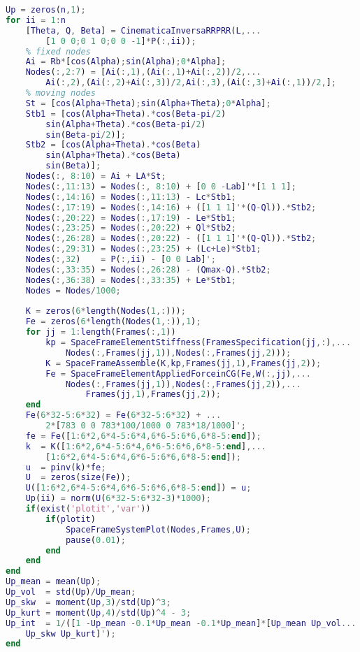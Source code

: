 \begin{lstlisting}[frame=single,language = matlab]
Up = zeros(n,1);
for ii = 1:n
    [Theta, Q, Beta] = CinematicaInversaRRPRR(L,...
        [1 0 0;0 1 0;0 0 -1]*P(:,ii));
    % fixed nodes
    Ai = Rb*[cos(Alpha);sin(Alpha);0*Alpha];
    Nodes(:,2:7) = [Ai(:,1),(Ai(:,1)+Ai(:,2))/2,...
        Ai(:,2),(Ai(:,2)+Ai(:,3))/2,Ai(:,3),(Ai(:,3)+Ai(:,1))/2,];
    % moving nodes
    St = [cos(Alpha+Theta);sin(Alpha+Theta);0*Alpha];
    Stb1 = [cos(Alpha+Theta).*cos(Beta-pi/2)
        sin(Alpha+Theta).*cos(Beta-pi/2)
        sin(Beta-pi/2)];
    Stb2 = [cos(Alpha+Theta).*cos(Beta)
        sin(Alpha+Theta).*cos(Beta)
        sin(Beta)];
    Nodes(:, 8:10) = Ai + LA*St;
    Nodes(:,11:13) = Nodes(:, 8:10) + [0 0 -Lab]'*[1 1 1];
    Nodes(:,14:16) = Nodes(:,11:13) - Lc*Stb1;
    Nodes(:,17:19) = Nodes(:,14:16) + ([1 1 1]'*(Q-Ql)).*Stb2;
    Nodes(:,20:22) = Nodes(:,17:19) - Le*Stb1;
    Nodes(:,23:25) = Nodes(:,20:22) + Ql*Stb2;
    Nodes(:,26:28) = Nodes(:,20:22) - ([1 1 1]'*(Q-Ql)).*Stb2;
    Nodes(:,29:31) = Nodes(:,23:25) + (Lc+Le)*Stb1;
    Nodes(:,32)    = P(:,ii) - [0 0 Lab]';
    Nodes(:,33:35) = Nodes(:,26:28) - (Qmax-Q).*Stb2;
    Nodes(:,36:38) = Nodes(:,33:35) + Le*Stb1;
    Nodes = Nodes/1000;
    
    K = zeros(6*length(Nodes(1,:)));
    Fe = zeros(6*length(Nodes(1,:)),1);
    for jj = 1:length(Frames(:,1))
        kp = SpaceFrameElementStiffness(FramesSpecification(jj,:),...
            Nodes(:,Frames(jj,1)),Nodes(:,Frames(jj,2)));
        K = SpaceFrameAssemble(K,kp,Frames(jj,1),Frames(jj,2));
        Fe = SpaceFrameElementAppliedForceinCG(Fe,W(:,jj),...
            Nodes(:,Frames(jj,1)),Nodes(:,Frames(jj,2)),...
                Frames(jj,1),Frames(jj,2));
    end
    Fe(6*32-5:6*32) = Fe(6*32-5:6*32) + ...
        2*[783 0 0 783*100/1000 0 783*18/1000]';
    fe = Fe([1:6*2,6*4-5:6*4,6*6-5:6*6,6*8-5:end]);
    k  = K([1:6*2,6*4-5:6*4,6*6-5:6*6,6*8-5:end],...
        [1:6*2,6*4-5:6*4,6*6-5:6*6,6*8-5:end]);
    u  = pinv(k)*fe;
    U  = zeros(size(Fe));
    U([1:6*2,6*4-5:6*4,6*6-5:6*6,6*8-5:end]) = u;
    Up(ii) = norm(U(6*32-5:6*32-3)*1000);
    if(exist('plotit','var'))
        if(plotit)
            SpaceFrameSystemPlot(Nodes,Frames,U);
            pause(0.01);
        end
    end
end
Up_mean = mean(Up);
Up_vol  = std(Up)/Up_mean;
Up_skw  = moment(Up,3)/std(Up)^3;
Up_kurt = moment(Up,4)/std(Up)^4 - 3;
Up_int  = 1/([1 -Up_mean -0.1*Up_mean -0.1*Up_mean]*[Up_mean Up_vol...
    Up_skw Up_kurt]'); 
end
\end{lstlisting}